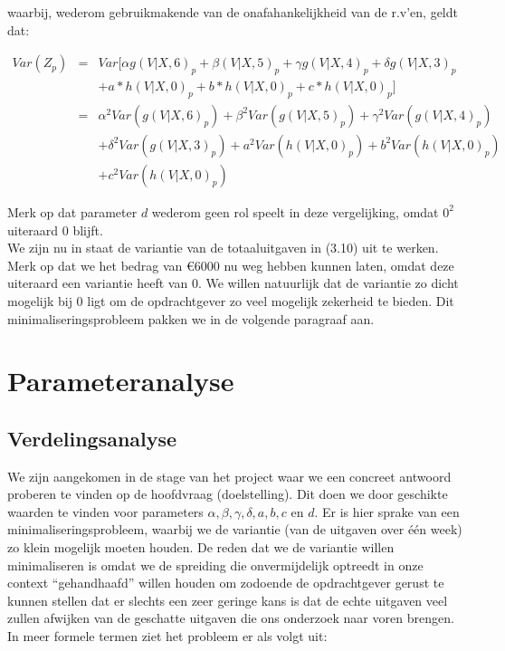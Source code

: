 waarbij, wederom gebruikmakende van de onafahankelijkheid van de r.v'en, geldt dat:

\begin{eqnarray*}
    Var(Z_{p}) & = & Var[\alpha g(V|X,6)_{p} + \beta(V|X,5)_{p} + \gamma g(V|X,4)_{p} + \delta g(V|X,3)_{p}\\
    & & + a*h(V|X,0)_{p} +b*h(V|X,0)_{p} +c*h(V|X,0)_{p}] \\  
    & = & \alpha^{2}Var(g(V|X,6)_{p}) + \beta^{2}Var(g(V|X,5)_{p}) + \gamma^{2}Var(g(V|X,4)_{p}) \\
    & & + \delta^{2}Var(g(V|X,3)_{p}) + a^{2}Var(h(V|X,0)_{p}) + b^{2}Var(h(V|X,0)_{p}) \\ & & + c^{2}Var(h(V|X,0)_{p})
\end{eqnarray*}

Merk op dat parameter $d$ wederom geen rol speelt in deze vergelijking, omdat $0^{2}$ uiteraard $0$ blijft.\\

We zijn nu in staat de variantie van de totaaluitgaven in (3.10) uit te werken. Merk op dat we het bedrag van \euro6000 nu weg hebben kunnen laten, omdat deze uiteraard een variantie heeft van 0. We willen natuurlijk dat de variantie zo dicht mogelijk bij 0 ligt om de opdrachtgever zo veel mogelijk zekerheid te bieden. Dit minimaliseringsprobleem pakken we in de volgende paragraaf aan.

\section{Parameteranalyse}
\subsection{Verdelingsanalyse}
We zijn aangekomen in de stage van het project waar we een concreet antwoord proberen te vinden op de hoofdvraag (doelstelling). Dit doen we door geschikte waarden te vinden voor parameters $\alpha, \beta, \gamma, \delta, a,b,c$ en $d$. Er is hier sprake van een minimaliseringsprobleem, waarbij we de variantie (van de uitgaven over één week) zo klein mogelijk moeten houden. De reden dat we de variantie willen minimaliseren is omdat we de spreiding die onvermijdelijk optreedt in onze context ``gehandhaafd'' willen houden om zodoende de opdrachtgever gerust te kunnen stellen dat er slechts een zeer geringe kans is dat de echte uitgaven veel zullen afwijken van de geschatte uitgaven die ons onderzoek naar voren brengen. In meer formele termen ziet het probleem er als volgt uit:

